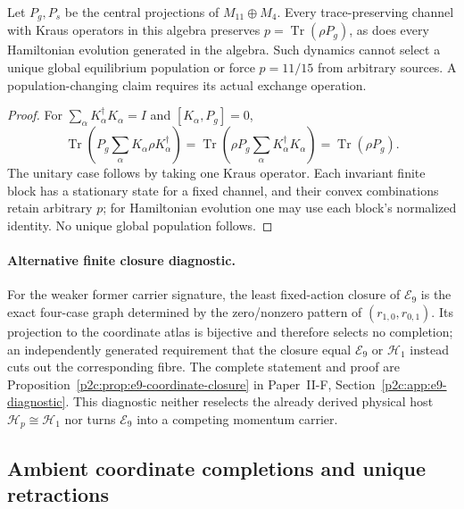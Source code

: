 \documentclass[12pt,a4paper]{article}
\begin{document}
\begin{corollary}
\label{p2c:cor:native-central-population-conservation}
Let $P_g,P_s$ be the central projections of $M_{11}\oplus M_4$.
Every trace-preserving channel with Kraus operators in this algebra
preserves $p=\operatorname{Tr}(\rho P_g)$, as does every Hamiltonian
evolution generated in the algebra.  Such dynamics cannot select a unique
global equilibrium population or force $p=11/15$ from arbitrary sources.
A population-changing claim requires its actual exchange operation.
\end{corollary}
\begin{proof}
For $\sum_\alpha K_\alpha^\dagger K_\alpha=I$ and
$[K_\alpha,P_g]=0$,
\[
 \operatorname{Tr}\!\left(P_g\sum_\alpha K_\alpha\rho K_\alpha^\dagger\right)
 =\operatorname{Tr}\!\left(\rho P_g
                \sum_\alpha K_\alpha^\dagger K_\alpha\right)
 =\operatorname{Tr}(\rho P_g).
\]
The unitary case follows by taking one Kraus operator.  Each invariant
finite block has a stationary state for a fixed channel, and their convex
combinations retain arbitrary $p$; for Hamiltonian evolution one may use
each block's normalized identity.  No unique global population follows.
\end{proof}

\paragraph{Alternative finite closure diagnostic.}
\label{p2c:rem:e9-coordinate-closure-diagnostic}
For the weaker former carrier signature, the least fixed-action closure of
\(\mathcal E_9\) is the exact four-case graph determined by the zero/nonzero
pattern of \((r_{1,0},r_{0,1})\).  Its projection to the coordinate atlas is
bijective and therefore selects no completion; an independently generated
requirement that the closure equal \(\mathcal E_9\) or \(\mathcal H_1\)
instead cuts out the corresponding fibre.  The complete statement and proof
are Proposition~\ref{p2c:prop:e9-coordinate-closure} in
Paper~II-F, Section~\ref{p2c:app:e9-diagnostic}.  This diagnostic neither reselects the
already derived physical host \(\mathcal H_p\cong\mathcal H_1\) nor turns
\(\mathcal E_9\) into a competing momentum carrier.

\subsection{Ambient coordinate completions and unique retractions}
\end{document}
